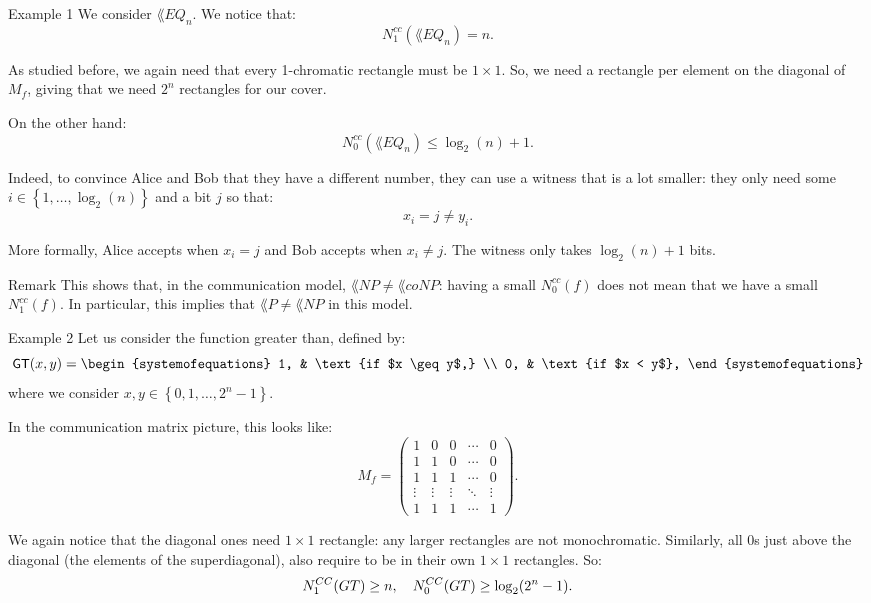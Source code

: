 \documentclass[a4paper]{article}
\begin{document}
\begin{parag}{Example 1}
    We consider $\lang{EQ}_n$. We notice that: 
    \[N_1^{cc}\left(\lang{EQ}_n\right) = n.\]

    As studied before, we again need that every 1-chromatic rectangle must be $1 \times 1$. So, we need a rectangle per element on the diagonal of $M_f$, giving that we need $2^n$ rectangles for our cover.

    On the other hand:
    \[N_0^{cc}\left(\lang{EQ}_n\right) \leq \log_2\left(n\right) + 1.\]

    Indeed, to convince Alice and Bob that they have a different number, they can use a witness that is a lot smaller: they only need some $i \in \left\{1, \ldots, \log_2\left(n\right)\right\}$ and a bit $j$ so that: 
    \[x_i = j \neq y_i.\]

    More formally, Alice accepts when $x_i = j$ and Bob accepts when $x_i \neq j$. The witness only takes $\log_2\left(n\right) + 1$ bits.

    \begin{subparag}{Remark}
        This shows that, in the communication model, $\lang{NP} \neq \lang{coNP}$: having a small $N_0^{cc}\left(f\right)$ does not mean that we have a small $N_1^{cc}\left(f\right)$. In particular, this implies that $\lang{P} \neq \lang{NP}$ in this model.
    \end{subparag}
\end{parag}

\begin{parag}{Example 2}
    Let us consider the function greater than, defined by: 
    \[\lang{GT}\left(x, y\right) = \begin{systemofequations} 1, & \text{if $x \geq y$,} \\ 0, & \text{if $x < y$}, \end{systemofequations}\]
    where we consider $x, y \in \left\{0, 1, \ldots, 2^n - 1\right\}$.
    
    In the communication matrix picture, this looks like: 
    \[M_f = \begin{pmatrix} 1 & 0 & 0 & \cdots & 0 \\ 1 & 1 & 0 & \cdots & 0 \\ 1 & 1 & 1 & \cdots & 0 \\ \vdots & \vdots & \vdots & \ddots & \vdots \\ 1 & 1 & 1 & \cdots & 1 \end{pmatrix}.\]

    We again notice that the diagonal ones need $1 \times 1$ rectangle: any larger rectangles are not monochromatic. Similarly, all 0s just above the diagonal (the elements of the superdiagonal), also require to be in their own $1 \times 1$ rectangles. So: 
    \[N_1^{CC}\left(GT\right) \geq n, \mathspace N_0^{CC}\left(GT\right) \geq \log_2\left(2^n - 1\right).\]
\end{parag}
\end{document}
